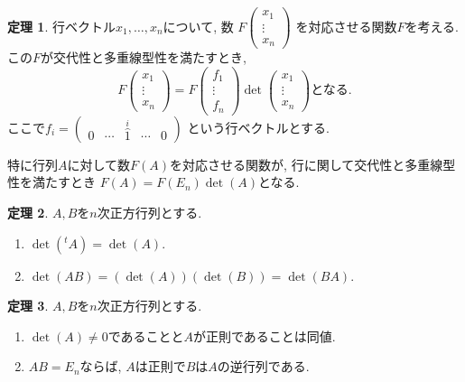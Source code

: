 \documentclass[dvipdfmx,a4paper,11pt]{article}
\theoremstyle{definition}
\newtheorem{thm}{定理}
\begin{document}
\begin{tcolorbox}[
    colback = white,
    colframe = green!35!black,
    fonttitle = \bfseries,
    breakable = true]
    \begin{thm}
行ベクトル$x_1, \ldots, x_n$について, 数
$F\begin{pmatrix}
x_1 \\ \vdots \\ x_{n}
\end{pmatrix}$
を対応させる関数$F$を考える.
この$F$が交代性と多重線型性を満たすとき, 
$$
F\begin{pmatrix}
x_1 \\ \vdots \\ x_{n}
\end{pmatrix}
=
F\begin{pmatrix}
f_1 \\ \vdots \\ f_{n}
\end{pmatrix}
\det
\begin{pmatrix}
x_1 \\ \vdots \\ x_{n}
\end{pmatrix}
\text{となる.}
$$
ここで$f_i =
\begin{pmatrix}
0 & \cdots&\overset{i}{\hat{1}}&\cdots &0
\end{pmatrix}
$
という行ベクトルとする.

特に行列$A$に対して数$F(A)$を対応させる関数が, 行に関して交代性と多重線型性を満たすとき
$F(A) =F(E_n) \det(A)$となる.
  \end{thm}
 \end{tcolorbox}
 
 
\begin{tcolorbox}[
    colback = white,
    colframe = green!35!black,
    fonttitle = \bfseries,
    breakable = true]
    \begin{thm}
    $A,B$を$n$次正方行列とする. 
    \begin{enumerate}
   \setlength{\parskip}{0cm} 
  \setlength{\itemsep}{0cm}   
 \item $\det({}^{t} A) =\det(A)$.
\item $\det(AB)=(\det(A))(\det(B)) = \det(BA)$.
\end{enumerate}
  \end{thm}
 \end{tcolorbox}
 
 \begin{tcolorbox}[
    colback = white,
    colframe = green!35!black,
    fonttitle = \bfseries,
    breakable = true]
    \begin{thm}
    $A,B$を$n$次正方行列とする. 
        \begin{enumerate}
    \setlength{\parskip}{0cm} 
  \setlength{\itemsep}{0cm}   
\item $\det(A) \neq 0$であることと$A$が正則であることは同値.
\item $AB=E_n$ならば, $A$は正則で$B$は$A$の逆行列である. 
\end{enumerate}
  \end{thm}
 \end{tcolorbox}
 
\end{document}
